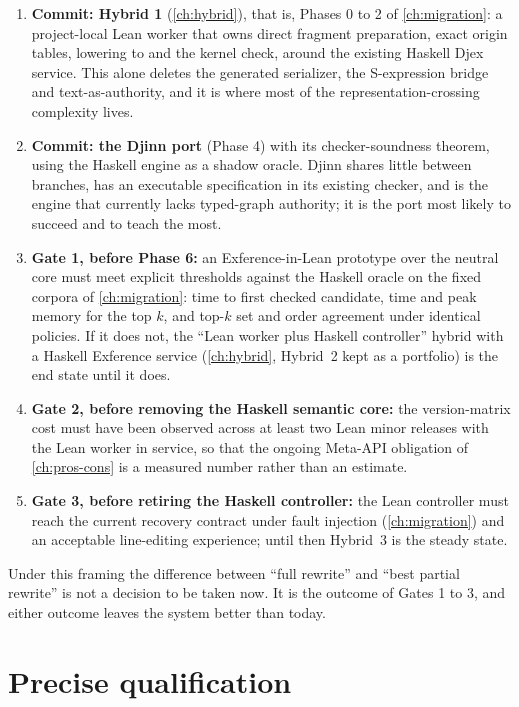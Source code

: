 \documentclass[10pt,letterpaper,oneside]{report}
\newcommand{\code}[1]{\texttt{\detokenize{#1}}}
\newcommand{\term}[1]{\textbf{#1}}
\begin{document}
\begin{enumerate}
  \item \term{Commit: Hybrid 1} (\autoref{ch:hybrid}), that is, Phases 0 to 2 of \autoref{ch:migration}: a project-local Lean worker that owns direct fragment preparation, exact origin tables, lowering to \code{Expr} and the kernel check, around the existing Haskell Djex service. This alone deletes the generated serializer, the S-expression bridge and text-as-authority, and it is where most of the representation-crossing complexity lives.
  \item \term{Commit: the Djinn port} (Phase 4) with its checker-soundness theorem, using the Haskell engine as a shadow oracle. Djinn shares little between branches, has an executable specification in its existing checker, and is the engine that currently lacks typed-graph authority; it is the port most likely to succeed and to teach the most.
  \item \term{Gate 1, before Phase 6:} an Exference-in-Lean prototype over the neutral core must meet explicit thresholds against the Haskell oracle on the fixed corpora of \autoref{ch:migration}: time to first checked candidate, time and peak memory for the top $k$, and top-$k$ set and order agreement under identical policies. If it does not, the ``Lean worker plus Haskell controller'' hybrid with a Haskell Exference service (\autoref{ch:hybrid}, Hybrid~2 kept as a portfolio) is the end state until it does.
  \item \term{Gate 2, before removing the Haskell semantic core:} the version-matrix cost must have been observed across at least two Lean minor releases with the Lean worker in service, so that the ongoing Meta-API obligation of \autoref{ch:pros-cons} is a measured number rather than an estimate.
  \item \term{Gate 3, before retiring the Haskell controller:} the Lean controller must reach the current recovery contract under fault injection (\autoref{ch:migration}) and an acceptable line-editing experience; until then Hybrid~3 is the steady state.
\end{enumerate}

Under this framing the difference between ``full rewrite'' and ``best partial rewrite'' is not a decision to be taken now. It is the outcome of Gates 1 to 3, and either outcome leaves the system better than today.

\section{Precise qualification}
\end{document}
